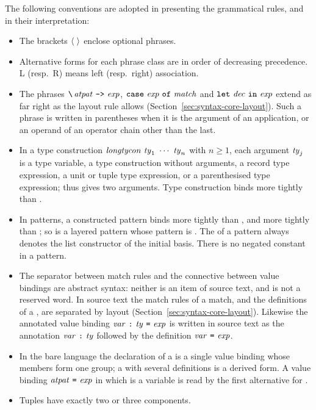 The following conventions are adopted in presenting the grammatical rules,
and in their interpretation:
\begin{itemize}
\item The brackets $\langle \ \rangle$ enclose optional phrases.
\item Alternative forms for each phrase class are in order of decreasing
  precedence. L (resp.\ R) means left (resp.\ right) association.
\item The phrases $\kw{\textbackslash}\,\atpat\ \kw{->}\ \expm$,
  $\kw{case}\ \expm\ \kw{of}\ \match$ and $\kw{let}\ \dec\ \kw{in}\ \expm$
  extend as far right as the layout rule allows
  (Section~\ref{sec:syntax-core-layout}). Such a phrase is written in
  parentheses when it is the argument of an application, or an operand of an
  operator chain other than the last.
\item In a type construction $\longtycon\ \ty_1\ \cdots\ \ty_n$ with
  $n \geq 1$, each argument $\mathit{ty}_j$ is a type variable, a type construction
  without arguments, a record type expression, a unit or tuple type
  expression, or a parenthesised type expression; thus 
  gives  two arguments. Type construction binds more tightly than
  \kw{->}.
\item In patterns, a constructed pattern binds more tightly than \kw{::},
  and \kw{::} more tightly than ; so  is a layered
  pattern whose pattern is . The \kw{::} of a pattern always
  denotes the list constructor of the initial basis. There is no negated
  constant in a pattern.
\item The separator \kw{;} between match rules and the connective 
  between value bindings are abstract syntax: neither is an item of source
  text, and  is not a reserved word. In source text the match rules of
  a match, and the definitions of a , are separated by layout
  (Section~\ref{sec:syntax-core-layout}). Likewise the annotated value binding
  $\var\ \kw{:}\ \ty\ \kw{=}\ \expm$ is written in source text as the
  annotation $\mathit{var}\ \textnormal{\texttt{:}}\ \mathit{ty}$ followed by the definition
  $\var\ \kw{=}\ \expm$.
\item In the bare language the declaration of a  is a single value
  binding whose members form one group; a  with several definitions
  is a derived form. A value binding $\atpat\ \kw{=}\ \expm$ in which \atpat{}
  is a variable is read by the first alternative for \valbind.
\item Tuples have exactly two or three components.
\end{itemize}

